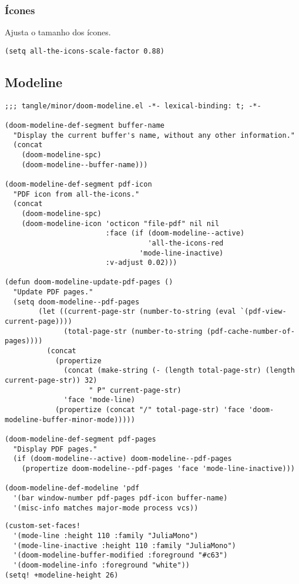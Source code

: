 \documentclass[11pt]{article}
\begin{document}
\subsubsection{Ícones}
\label{sec:orgc9026d2}
Ajusta o tamanho dos ícones.

\begin{verbatim}
(setq all-the-icons-scale-factor 0.88)
\end{verbatim}

\subsection{Modeline}
\label{sec:org8438328}

\begin{verbatim}
;;; tangle/minor/doom-modeline.el -*- lexical-binding: t; -*-

(doom-modeline-def-segment buffer-name
  "Display the current buffer's name, without any other information."
  (concat
    (doom-modeline-spc)
    (doom-modeline--buffer-name)))

(doom-modeline-def-segment pdf-icon
  "PDF icon from all-the-icons."
  (concat
    (doom-modeline-spc)
    (doom-modeline-icon 'octicon "file-pdf" nil nil
                        :face (if (doom-modeline--active)
                                  'all-the-icons-red
                                'mode-line-inactive)
                        :v-adjust 0.02)))

(defun doom-modeline-update-pdf-pages ()
  "Update PDF pages."
  (setq doom-modeline--pdf-pages
        (let ((current-page-str (number-to-string (eval `(pdf-view-current-page))))
              (total-page-str (number-to-string (pdf-cache-number-of-pages))))
          (concat
            (propertize
              (concat (make-string (- (length total-page-str) (length current-page-str)) 32)
                    " P" current-page-str)
              'face 'mode-line)
            (propertize (concat "/" total-page-str) 'face 'doom-modeline-buffer-minor-mode)))))

(doom-modeline-def-segment pdf-pages
  "Display PDF pages."
  (if (doom-modeline--active) doom-modeline--pdf-pages
    (propertize doom-modeline--pdf-pages 'face 'mode-line-inactive)))

(doom-modeline-def-modeline 'pdf
  '(bar window-number pdf-pages pdf-icon buffer-name)
  '(misc-info matches major-mode process vcs))

\end{verbatim}

\begin{verbatim}
(custom-set-faces!
  '(mode-line :height 110 :family "JuliaMono")
  '(mode-line-inactive :height 110 :family "JuliaMono")
  '(doom-modeline-buffer-modified :foreground "#c63")
  '(doom-modeline-info :foreground "white"))
(setq! +modeline-height 26)
\end{verbatim}
\end{document}
